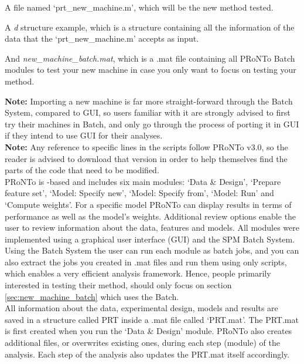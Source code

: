 \bi
\item A file named `prt\_new\_machine.m', which will be the new method tested.
\item A \textit{d} structure example, which is a structure containing all the information of the data that the `prt\_new\_machine.m' accepts as input.
\item And \textit{new\_machine\_batch.mat}, which is a .mat file containing all PRoNTo Batch modules to test your new machine in case you only want to focus on testing your method.
\ei

\noindent \textbf{Note:} Importing a new machine is far more straight-forward through the Batch System, compared to GUI, so users familiar with it are strongly advised to first try their machines in Batch, and only go through the process of porting it in GUI if they intend to use GUI for their analyses.
\\

\noindent \textbf{Note:} Any reference to specific lines in the scripts follow PRoNTo v3.0, so the reader is advised to download that version in order to help themselves find the parts of the code that need to be modified.
\\

PRoNTo is \matlab-based and includes six main modules: `Data \& Design', `Prepare feature set', `Model: Specify new', `Model: Specify from', `Model: Run' and `Compute weights'. For a specific model PRoNTo can display results in terms of performance as well as  the model's weights. Additional review options enable the user to review information about the data, features and models. All modules were implemented using a graphical user interface (GUI) and the \matlab{} SPM Batch System. Using the \matlab{}  Batch System the user can run each module as batch jobs, and you can also extract the jobs you created in .mat files and run them using only scripts, which enables a very efficient analysis framework. Hence, people primarily interested in testing their method, should only focus on section \ref{sec:new_machine_batch} which uses the Batch.
\\

All information about the data, experimental design, models and results are saved in a structure called PRT inside a .mat file called `PRT.mat'. The PRT.mat is first created when you run the `Data \& Design' module. PRoNTo also creates additional files, or overwrites existing ones, during each step (module) of the analysis. Each step of the analysis also updates the PRT.mat itself accordingly. 
\\


